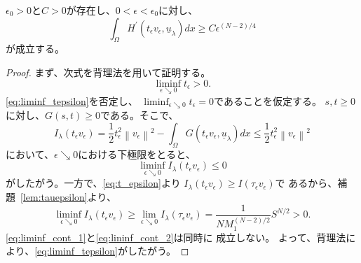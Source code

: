 \begin{lem} \label{lem:intHprime}
 $\epsilon_0 > 0$と$C > 0$が存在し、$0 < \epsilon < \epsilon_0$に対し、
 \begin{equation}
  \int_\Omega H^\prime(t_\epsilon v_\epsilon, \underline{u}_\lambda)
   dx \geq C\epsilon^{(N-2)/4} \label{eq:int_Hprime}
 \end{equation}
 が成立する。
\end{lem}

\begin{proof}
まず、次式を背理法を用いて証明する。
\begin{equation}
 \liminf_{\epsilon \searrow 0} t_\epsilon > 0. \label{eq:liminf_tepsilon}
\end{equation}
\eqref{eq:liminf_tepsilon}を否定し、
$\liminf_{\epsilon \searrow 0} t_\epsilon = 0$であることを仮定する。
$s, t \geq 0$に対し、$G(s, t) \geq 0$である。そこで、
\begin{equation}
 I_\lambda(t_\epsilon v_\epsilon) = \frac{1}{2} t_\epsilon^2 \left\|
                                                              v_\epsilon
                                                             \right\|^2
 - \int_\Omega G(t_\epsilon v_\epsilon, \underline{u}_\lambda) dx \leq
 \frac{1}{2} t_\epsilon^2 \left\| v_\epsilon \right\|^2
\end{equation}
において、$\epsilon \searrow 0$における下極限をとると、
\begin{equation}
 \liminf_{\epsilon \searrow 0} I_\lambda (t_\epsilon v_\epsilon) \leq
  0 \label{eq:liminf_cont_1}
\end{equation}
がしたがう。一方で、\eqref{eq:t_epsilon}より
$I_\lambda(t_\epsilon v_\epsilon) \geq I(\tau_\epsilon v_\epsilon)$で
あるから、補題~\ref{lem:tauepsilon}より、
\begin{equation}
  \liminf_{\epsilon \searrow 0} I_\lambda(t_\epsilon v_\epsilon) \geq
 \lim_{\epsilon \searrow 0} I_\lambda (\tau_\epsilon v_\epsilon) =
 \frac{1}{NM_1^{(N-2)/2}} S^{N/2} > 0. \label{eq:lininf_cont_2}
\end{equation}
\eqref{eq:liminf_cont_1}と\eqref{eq:lininf_cont_2}は同時に
成立しない。
よって、背理法により、\eqref{eq:liminf_tepsilon}がしたがう。 


\end{proof}
